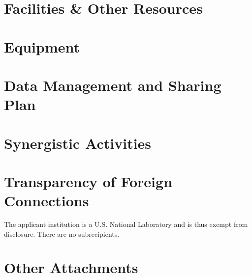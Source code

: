 \documentclass[11pt]{article}
\begin{document}
\thispagestyle{empty}
\hypersetup{pageanchor=false}
\AddToShipoutPicture*{\BackgroundPic}


\clearpage
\hypersetup{pageanchor=true}

\ifdefined\tocflag
\thispagestyle{empty}
\tableofcontents
\clearpage
\fi
{}

\thispagestyle{fancy}
\setlength{\headheight}{19.7478pt}
\setlength{\headsep}{4pt}
\newlength{\nsfoffset}
\setlength{\nsfoffset}{\headheight}
\addtolength{\nsfoffset}{\baselineskip}

\ifdefined\linenoflag
\linenumbers
\fi



\clearpage
\appendix


\clearpage

\section{Facilities \& Other Resources}\label{sec:facilities}


\section{Equipment}\label{sec:equipment}


\clearpage
\section{Data Management and Sharing Plan}\label{sec:dataplan}


\clearpage
\section{Synergistic Activities}\label{sec:synergy}


\clearpage
\section{Transparency of Foreign Connections}
The applicant institution is a U.S. National Laboratory and is thus exempt from disclosure. There are no subrecipients.

\clearpage
\section{Other Attachments}\label{sec:other}

\end{document}
